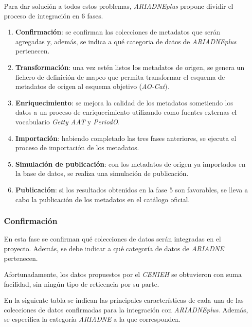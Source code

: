 Para dar solución a todos estos problemas, \emph{ARIADNEplus} propone dividir
el proceso de integración en 6 fases.


\begin{enumerate}
\def\labelenumi{\arabic{enumi}.}
\tightlist
\item
  \textbf{Confirmación}: se confirman las colecciones de metadatos que
  serán agregadas y, además, se indica a qué categoria de datos de
  \emph{ARIADNEplus} pertenecen.
\item
  \textbf{Transformación}: una vez estén listos los metadatos de origen,
  se genera un fichero de definición de mapeo que permita transformar el
  esquema de metadatos de origen al esquema objetivo (\emph{AO-Cat}).
\item
  \textbf{Enriquecimiento}: se mejora la calidad de los metadatos
  sometiendo los datos a un proceso de enriquecimiento utilizando como
  fuentes externas el vocabulario \emph{Getty AAT} y \emph{PeriodO}.
\item
  \textbf{Importación}: habiendo completado las tres fases anteriores,
  se ejecuta el proceso de importación de los metadatos.
\item
  \textbf{Simulación de publicación}: con los metadatos de origen ya
  importados en la base de datos, se realiza una simulación de
  publicación.
\item
  \textbf{Publicación}: si los resultados obtenidos en la fase 5 son
  favorables, se lleva a cabo la publicación de los metadatos en el
  catálogo oficial.
\end{enumerate}

\subsubsection{Confirmación}

En esta fase se confirman qué colecciones de datos serán integradas en
el proyecto. Además, se debe indicar a qué categoría de datos de \emph{ARIADNE}
pertenecen.


Afortunadamente, los datos propuestos por el \emph{CENIEH} se obtuvieron con suma facilidad,
sin ningún tipo de reticencia por su parte. 

En la siguiente tabla se indican las principales características de cada una de las
colecciones de datos confirmadas para la integración con \emph{ARIADNEplus}.
Además, se especifica la categoría \emph{ARIADNE} a la que corresponden.

